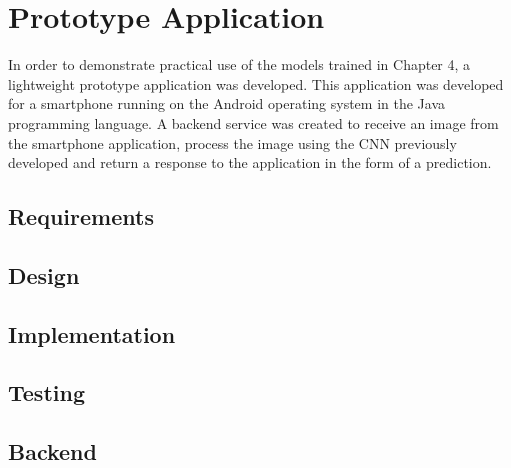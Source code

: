 \chapter{Prototype Application}
\label{prototype}
In order to demonstrate practical use of the models trained in Chapter 4, a lightweight prototype application was developed.
This application was developed for a smartphone running on the Android operating system in the Java programming language.
A backend service was created to receive an image from the smartphone
application, process the image using the CNN previously developed and return a
response to the application in the form of a prediction.

\section{Requirements}


\section{Design}


\section{Implementation}


\section{Testing}


\section{Backend}

